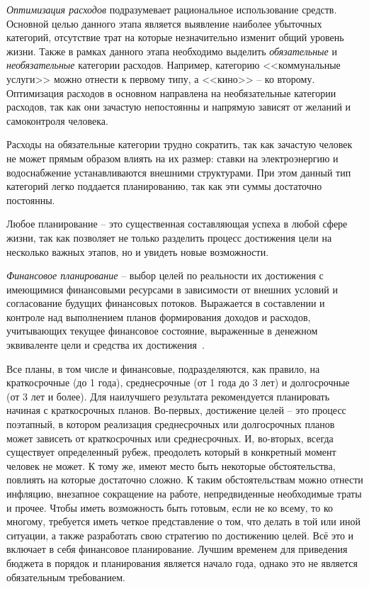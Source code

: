 \emph{Оптимизация расходов} подразумевает рациональное использование средств.
Основной целью данного этапа является выявление наиболее убыточных категорий, отсутствие трат на которые незначительно изменит общий уровень жизни. Также в рамках данного этапа необходимо выделить \emph{обязательные} и \emph{необязательные} категории расходов.
Например, категорию <<коммунальные услуги>> можно отнести к первому типу, а <<кино>> -- ко второму.
Оптимизация расходов в основном направлена на необязательные категории расходов, так как они зачастую непостоянны и напрямую зависят от желаний и самоконтроля человека.

Расходы на обязательные категории трудно сократить, так как зачастую человек не может прямым образом влиять на их размер: ставки на электроэнергию и водоснабжение устанавливаются внешними структурами.
При этом данный тип категорий легко поддается планированию, так как эти суммы достаточно постоянны.

Любое планирование -- это существенная составляющая успеха в любой сфере жизни, так как позволяет не только разделить процесс достижения цели на несколько важных этапов, но и увидеть новые возможности.

\emph{Финансовое планирование} -- выбор целей по реальности их достижения с имеющимися финансовыми ресурсами в зависимости от внешних условий и согласование будущих финансовых потоков. Выражается в составлении и контроле над выполнением планов формирования доходов и расходов, учитывающих текущее финансовое состояние, выраженные в денежном эквиваленте цели и средства их достижения~\cite{finance_planning}.

Все планы, в том числе и финансовые, подразделяются, как правило, на краткосрочные (до 1 года), среднесрочные (от 1 года до 3 лет) и долгосрочные (от 3 лет и более).
Для наилучшего результата рекомендуется планировать начиная с краткосрочных планов.
Во-первых, достижение целей -- это процесс поэтапный, в котором реализация среднесрочных или долгосрочных планов может зависеть от краткосрочных или среднесрочных.
И, во-вторых, всегда существует определенный рубеж, преодолеть который в конкретный момент человек не может.
К тому же, имеют место быть некоторые обстоятельства, повлиять на которые достаточно сложно.
К таким обстоятельствам можно отнести инфляцию, внезапное сокращение на работе, непредвиденные необходимые траты и прочее.
Чтобы иметь возможность быть готовым, если не ко всему, то ко многому, требуется иметь четкое представление о том, что делать в той или иной ситуации, а также разработать свою стратегию по достижению целей.
Всё это и включает в себя финансовое планирование.
Лучшим временем для приведения бюджета в порядок и планирования является начало года, однако это не является обязательным требованием.

